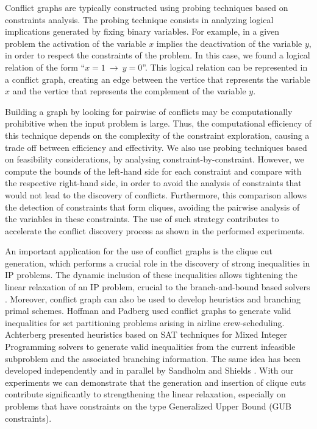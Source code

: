 \documentclass{endm}
\begin{document}
Conflict graphs are typically constructed using probing techniques \cite{Borndorfer1998} based on constraints analysis. The probing technique consists in analyzing logical implications generated by fixing binary variables. For example, in a given problem the activation of the variable $x$ implies the deactivation of the variable $y$, in order to respect the constraints of the problem. In this case, we found a logical relation of the form ``$x = 1 \ \rightarrow \ y = 0$''. This logical relation can be represented in a conflict graph, creating an edge between the vertice that represents the variable $x$ and the vertice that represents the complement of the variable $y$.

Building a graph by looking for pairwise of conflicts may be computationally prohibitive when the input problem is large. Thus, the computational efficiency of this technique depends on the complexity of the constraint exploration, causing a trade off between efficiency and effectivity. We also use probing techniques based on feasibility considerations, by analysing constraint-by-constraint. However, we compute the bounds of the left-hand side for each constraint and compare with the respective right-hand side, in order to avoid the analysis of constraints that would not lead to the discovery of conflicts. Furthermore, this comparison allows the detection of constraints that form cliques, avoiding the pairwise analysis of the variables in these constraints. The use of such strategy contributes to accelerate the conflict discovery process as shown in the performed experiments.

An important application for the use of conflict graphs is the clique cut generation, which performs a crucial role in the discovery of strong inequalities \cite{chvatal} in IP problems. The dynamic inclusion of these inequalities allows tightening the linear relaxation of an IP problem, crucial to the branch-and-bound based solvers \cite{atamturk}. Moreover, conflict graph can also be used to develop heuristics and branching primal schemes. Hoffman and Padberg \cite{hoffman} used conflict graphs to generate valid inequalities for set partitioning problems arising in airline crew-scheduling. Achterberg \cite{achterberg} presented heuristics based on SAT techniques for Mixed Integer Programming solvers to generate valid inequalities from the current infeasible subproblem and the associated branching information. The same idea has been developed independently and in parallel by Sandholm and Shields \cite{sandholm}. With our experiments we can demonstrate that the generation and insertion of clique cuts contribute significantly to strengthening the linear relaxation, especially on problems that have constraints on the type Generalized Upper Bound (GUB constraints).
\end{document}
